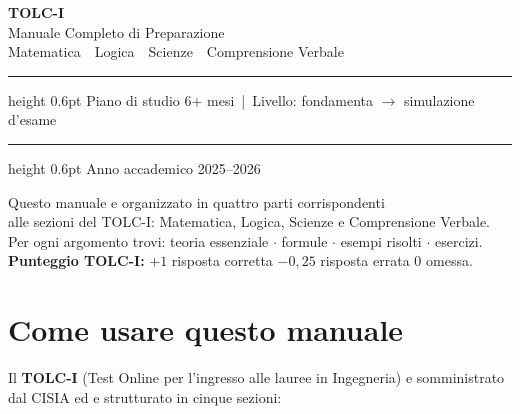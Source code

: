 \documentclass[12pt, a4paper, twoside, openright]{book}
\theoremstyle{definition}
\begin{document}

\frontmatter

\begin{titlepage}
\centering
\vspace*{2cm}
{\color{tolcblue}\fontsize{52}{56}\selectfont\bfseries TOLC-I}\\[12pt]
{\Large\color{tolcteal} Manuale Completo di Preparazione}\\[8pt]
{\normalsize\color{gray} Matematica \,\textbullet\, Logica \,\textbullet\, Scienze \,\textbullet\, Comprensione Verbale}\\[3cm]
\hrule height 0.6pt
\vspace{6pt}
{\small Piano di studio 6+ mesi \,|\, Livello: fondamenta $\to$ simulazione d'esame}
\vspace{6pt}
\hrule height 0.6pt
\vfill
{\small Anno accademico 2025--2026}
\end{titlepage}

\clearpage\thispagestyle{empty}
\vspace*{\fill}
\begin{center}
  \small
  Questo manuale e organizzato in quattro parti corrispondenti\\
  alle sezioni del TOLC-I: Matematica, Logica, Scienze e Comprensione Verbale.\\[6pt]
  Per ogni argomento trovi: teoria essenziale $\cdot$ formule $\cdot$ esempi risolti $\cdot$ esercizi.\\[6pt]
  \textbf{Punteggio TOLC-I:} $+1$ risposta corretta \quad $-0{,}25$ risposta errata \quad $0$ omessa.
\end{center}
\vspace*{\fill}

\tableofcontents

\chapter*{Come usare questo manuale}

Il \textbf{TOLC-I} (Test Online per l'ingresso alle lauree in Ingegneria) e somministrato
dal CISIA ed e strutturato in cinque sezioni:
\end{document}
